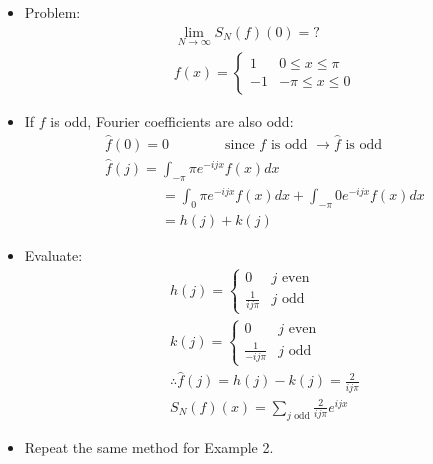 \documentclass[12pt, a4paper]{article}
\begin{document}
\begin{itemize}
    \item Problem: 
    \begin{gather*}
        \lim_{N\to\infty} S_N(f)(0) = ?\\
        f(x)=\begin{cases}
            1 & 0 \leq x \leq \pi\\
            -1 & -\pi\leq x \leq 0
        \end{cases}
    \end{gather*}
    \item If $f$ is odd, Fourier coefficients are also odd:
    \begin{gather*}
        \hat{f}(0) = 0 \qquad\qquad \text{since $f$ is odd }\rightarrow \hat{f}\text{ is odd}\\
        \hat{f}(j) = \int_{-\pi}{\pi}e^{-ijx}f(x)dx\\
        \qquad\qquad= \int_{0}{\pi}e^{-ijx}f(x)dx+ \int_{-\pi}{0}e^{-ijx}f(x)dx\\
        \qquad\qquad= h(j)+k(j)
    \end{gather*}
    \item Evaluate:
    \begin{gather*}
        h(j)=\begin{cases}
            0 & j \text{ even}\\
            \frac{1}{ij\pi} & j\text{ odd}
        \end{cases}\\
        k(j)=\begin{cases}
            0 & j \text{ even}\\
            \frac{1}{-ij\pi} & j\text{ odd}
        \end{cases}\\
        \therefore \hat{f}(j)  = h(j)-k(j)=\frac{2}{ij\pi}\\
        S_N(f)(x)=\sum_{j \text{ odd}}\frac{2}{ij\pi}e^{ijx}
    \end{gather*}
    \item Repeat the same method for Example 2.
\end{itemize}
\vspace{0.3em}
\end{document}

